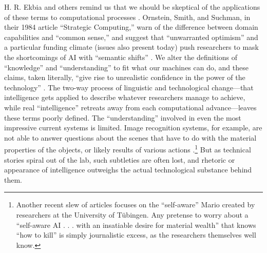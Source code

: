 H. R. Ekbia and others remind us that we should be skeptical of the
applications of these terms to computational processes \cite{ekbia}.
Ornstein, Smith, and Suchman, in their 1984 
article ``Strategic Computing,'' warn of the difference between domain
capabilities and ``common sense,'' and suggest that ``unwarranted
optimism'' and a particular funding climate (issues also present today)
push researchers to mask the shortcomings of AI with ``semantic
shifts'' \cite[p. 14]{ornstein}. We alter the definitions of ``knowledge'' and ``understanding''
to fit what our machines can do, and these claims, taken literally,
``give rise to unrealistic confidence in the power of the
technology'' \cite[p. 15]{ornstein}.
The two-way process of linguistic and technological change---that
intelligence gets applied to describe whatever researchers manage to
achieve, while real ``intelligence'' retreats away from each
computational advance---leaves these terms poorly defined. The ``understanding''
involved in even the most impressive current systems is limited. Image
recognition systems, for example, are not
able to answer questions about the scenes that have to do with
the material properties of the objects, or likely results of various
actions \cite{gomesJordan}.\footnote{Another recent slew of articles focuses on
the ``self-aware'' Mario created by researchers at the University of
T\"{u}bingen. Any pretense to worry about a ``self-aware AI . . . with
an insatiable desire for material wealth'' that knows ``how to kill'' \cite{vincentMario}
is simply journalistic excess, as the
  researchers themselves well know.} But as technical stories spiral out of the
lab, such subtleties are often lost, and rhetoric or appearance of
intelligence outweighs the actual technological substance behind them.



